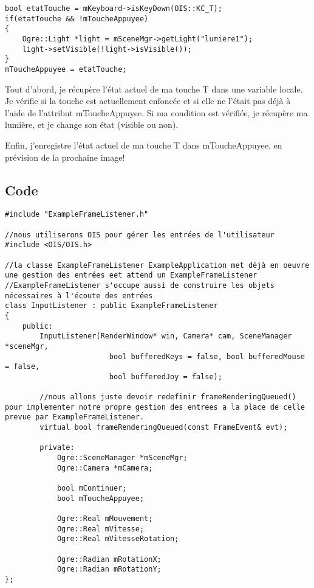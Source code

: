 \begin{lstlisting}[caption={Capture de l'\'etat ponctuel d'une touche}]
bool etatTouche = mKeyboard->isKeyDown(OIS::KC_T);
if(etatTouche && !mToucheAppuyee)
{
    Ogre::Light *light = mSceneMgr->getLight("lumiere1");
    light->setVisible(!light->isVisible());
}
mToucheAppuyee = etatTouche;
\end{lstlisting}





Tout d'abord, je r\'ecup\`ere l'\'etat actuel de ma touche T dans une variable locale. Je v\'erifie si la touche est actuellement enfonc\'ee et si elle ne l'\'etait pas d\'ej\`a \`a l'aide de l'attribut mToucheAppuyee. Si ma condition est v\'erifi\'ee, je r\'ecup\`ere ma lumi\`ere, et je change son \'etat (visible ou non).

Enfin, j'enregistre l'\'etat actuel de ma touche T dans mToucheAppuyee, en pr\'evision de la prochaine image!







\subsection{Code}


\begin{lstlisting}[caption={InputListener.h}]
#include "ExampleFrameListener.h"

//nous utiliserons OIS pour gérer les entrées de l'utilisateur
#include <OIS/OIS.h>

//la classe ExampleFrameListener ExampleApplication met déjà en oeuvre une gestion des entrées eet attend un ExampleFrameListener
//ExampleFrameListener s'occupe aussi de construire les objets nécessaires à l'écoute des entrées
class InputListener : public ExampleFrameListener
{
    public:
        InputListener(RenderWindow* win, Camera* cam, SceneManager *sceneMgr, 
                        bool bufferedKeys = false, bool bufferedMouse = false, 
                        bool bufferedJoy = false);
        
        //nous allons juste devoir redefinir frameRenderingQueued() pour implementer notre propre gestion des entrees a la place de celle prevue par ExampleFrameListener.
        virtual bool frameRenderingQueued(const FrameEvent& evt);

        private:
            Ogre::SceneManager *mSceneMgr;
            Ogre::Camera *mCamera;
            
            bool mContinuer;
            bool mToucheAppuyee;

            Ogre::Real mMouvement;
            Ogre::Real mVitesse;
            Ogre::Real mVitesseRotation;

            Ogre::Radian mRotationX;
            Ogre::Radian mRotationY;
};
\end{lstlisting}


